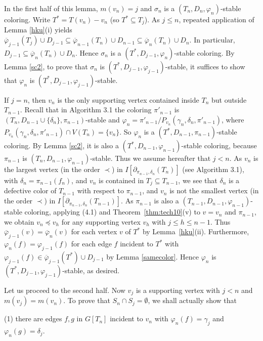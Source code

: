 \documentclass[11pt]{article}
\newcommand{\phibar}{\overline{\varphi}}
\newcommand{\phiv}{\varphi}
\begin{document}
In the first half of this lemma, $m(v_n) =j$ and $\sigma_n$ is a $(T_n, D_n, \varphi_n)$-stable coloring. Write $T^*=T(v_n)-v_n$
(so $T^*\subseteq T_j$). As $j\leq n$, repeated application of Lemma \ref{hku}(i) yields $\phibar_{j-1}(T_j)\cup D_{j-1}\subseteq 
\phibar_{n-1}(T_n)\cup D_{n-1} \subseteq \phibar_n(T_n) \cup D_n$. In particular, $D_{j-1}\subseteq \phibar_n(T_n) \cup D_n$. Hence $\sigma_n$ is a 
$(T^*, D_{j-1}, \varphi_n)$-stable coloring. By Lemma \ref{sc2}, to prove that $\sigma_n$ is $(T^*, D_{j-1},\varphi_{j-1})$-stable,
it suffices to show that $\phiv_n$ is $(T^*, D_{j-1}, \phiv_{j-1})$-stable. 

If $j=n$, then $v_n$ is the only supporting vertex contained inside $T_n$ but outside $T_{n-1}$. Recall that in Algorithm 3.1 the coloring
$\pi'_{n-1}$ is $(T_{n},D_{n-1}\cup\{\delta_n\},\pi_{n-1})$-stable and $\varphi_n=\pi'_{n-1}/P_{v_n}(\gamma_n,\delta_n,\pi'_{n-1})$, where 
$P_{v_n}(\gamma_n,\delta_n,\pi'_{n-1})\cap V(T_n)=\{v_n\}$. So $\phiv_n$ is a $(T^*, D_{n-1}, \pi_{n-1})$-stable
coloring. By Lemma \ref{sc2}, it is also a $(T^*, D_{n-1}, \phiv_{n-1})$-stable coloring, because $\pi_{n-1}$ is $(T_{n},D_{n-1},\varphi_{n-1})$-stable. 
Thus we assume hereafter that $j < n$. As $v_n$ is the largest vertex (in the order $\prec$) in $I[\partial_{\pi_{n-1}, \delta_{n}}(T_{n})]$
(see Algorithm 3.1), with $\delta_{n}=\pi_{n-1}(f_n)$, and $v_n$ is contained in $T_{j}\subseteq T_{n-1}$, we see that $\delta_{n}$ is a defective 
color of $T_{n-1}$ with respect to $\pi_{n-1}$, and $v_n$ is not the smallest vertex (in the order $\prec$) in $I[\partial_{\pi_{n-1}, 
\delta_{n}}(T_{n-1})]$. As $\pi_{n-1}$ is also a $(T_{n-1},D_{n-1},\varphi_{n-1})$-stable coloring, applying (4.1) and Theorem~\ref{thm:tech10}(v) 
to $v=v_n$ and $\pi_{n-1}$, we obtain $v_n \preceq v_h$ for any supporting vertex $v_h$ with $j \le h \le n-1$.  Thus $\phibar_{j-1}(v)=\phibar_{n}(v)$ 
for each vertex $v$ of $T^*$ by Lemma~\ref{hku}(ii). Furthermore, $\phiv_n(f) =\phiv_{j-1}(f)$ for each edge $f$ incident to $T^*$ with 
$\phiv_{j-1}(f) \in \phibar_{j-1}(T^*)\cup D_{j-1}$ by Lemma \ref{samecolor}. Hence $\phiv_n$ is $(T^*, D_{j-1}, \phiv_{j-1})$-stable, as desired. 

Let us proceed to the second half. Now $v_j$ is a supporting vertex with $j< n$ and $m(v_j)=m(v_n)$. 
To prove that $S_n \cap S_j = \emptyset$, we shall actually show that

(1) there are edges $f,g$ in $G[T_n]$ incident to $v_n$ with $\varphi_n(f)=\gamma_j$ and $\varphi_n(g)=\delta_j$.
\end{document}
